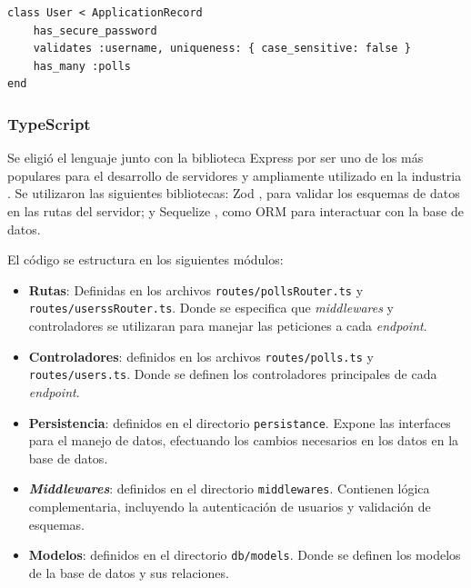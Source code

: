 \documentclass[11pt]{article}
\let\Oldsubsubsection\subsubsection
\renewcommand{\subsubsection}{\FloatBarrier\Oldsubsubsection}
\newcommand{\english}[1]{\textit{#1}}
\begin{document}
\begin{listing}
\begin{verbatim}
class User < ApplicationRecord
    has_secure_password
    validates :username, uniqueness: { case_sensitive: false }
    has_many :polls
end
\end{verbatim}
\caption{Definición del Modelo \lstinline{User} en Ruby on Rails}
\label{code:http:ruby_user_model}
\end{listing}

\subsubsection{TypeScript}

Se eligió el lenguaje junto con la biblioteca Express \cite{js:lib:express} por ser uno de los más populares para el desarrollo de servidores y ampliamente utilizado en la industria \cite{http:web_frameworks_survey}. Se utilizaron las siguientes bibliotecas: Zod \cite{js:lib:zod}, para validar los esquemas de datos en las rutas del servidor; y Sequelize \cite{js:lib:sequelize}, como ORM para interactuar con la base de datos.

El código se estructura en los siguientes módulos:

\begin{itemize}
    \item \textbf{Rutas}: Definidas en los archivos \lstinline{routes/pollsRouter.ts} y \lstinline{routes/userssRouter.ts}. Donde se especifica que \english{middlewares} y controladores se utilizaran para manejar las peticiones a cada \english{endpoint}.
    
    \item \textbf{Controladores}: definidos en los archivos \lstinline{routes/polls.ts} y \lstinline{routes/users.ts}. Donde se definen los controladores principales de cada \english{endpoint}.

    \item \textbf{Persistencia}: definidos en el directorio \lstinline{persistance}. Expone las interfaces para el manejo de datos, efectuando los cambios necesarios en los datos en la base de datos.
    
    \item \textbf{\english{Middlewares}}: definidos en el directorio \lstinline{middlewares}. Contienen lógica complementaria, incluyendo la autenticación de usuarios y validación de esquemas.
    
    \item \textbf{Modelos}: definidos en el directorio \lstinline{db/models}. Donde se definen los modelos de la base de datos y sus relaciones.
\end{itemize}
\end{document}
